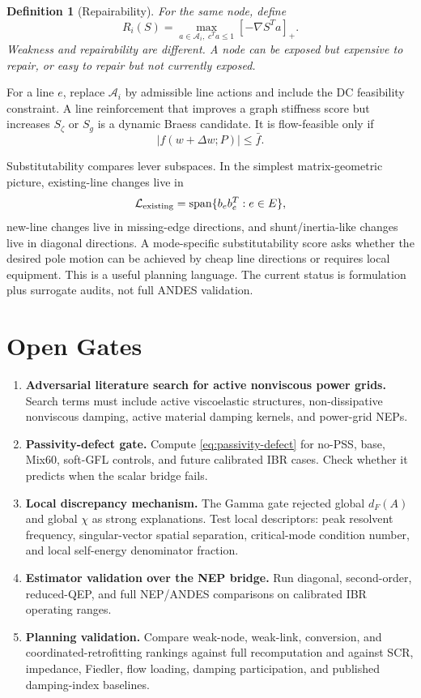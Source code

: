 \documentclass[11pt]{article}
\newtheorem{definition}{Definition}
\begin{document}
\begin{definition}[Repairability]
For the same node, define
\begin{equation}
  R_i(S)=\max_{a\in\mathcal A_i,\;c^Ta\le1}
  \left[-\nabla S^T a\right]_+ .
  \label{eq:repairability}
\end{equation}
Weakness and repairability are different. A node can be exposed but expensive
to repair, or easy to repair but not currently exposed.
\end{definition}

For a line $e$, replace $\mathcal A_i$ by admissible line actions and include
the DC feasibility constraint. A line reinforcement that improves a graph
stiffness score but increases $S_\zeta$ or $S_g$ is a dynamic Braess candidate.
It is flow-feasible only if
\begin{equation}
  |f(w+\Delta w;P)|\le \bar f.
  \label{eq:flow-feasible}
\end{equation}

Substitutability compares lever subspaces. In the simplest matrix-geometric
picture, existing-line changes live in
\[
  \mathcal L_{\rm existing}=\operatorname{span}\{b_eb_e^T:e\in E\},
\]
new-line changes live in missing-edge directions, and shunt/inertia-like
changes live in diagonal directions. A mode-specific substitutability score
asks whether the desired pole motion can be achieved by cheap line directions
or requires local equipment. This is a useful planning language. The current
status is formulation plus surrogate audits, not full ANDES validation.

\section{Open Gates}

\begin{enumerate}[leftmargin=*]
\item \textbf{Adversarial literature search for active nonviscous power grids.}
Search terms must include active viscoelastic structures, non-dissipative
nonviscous damping, active material damping kernels, and power-grid NEPs.
\item \textbf{Passivity-defect gate.} Compute \eqref{eq:passivity-defect} for
no-PSS, base, Mix60, soft-GFL controls, and future calibrated IBR cases.
Check whether it predicts when the scalar bridge fails.
\item \textbf{Local discrepancy mechanism.} The Gamma gate rejected global
$d_F(A)$ and global $\chi$ as strong explanations. Test local descriptors:
peak resolvent frequency, singular-vector spatial separation, critical-mode
condition number, and local self-energy denominator fraction.
\item \textbf{Estimator validation over the NEP bridge.} Run diagonal,
second-order, reduced-QEP, and full NEP/ANDES comparisons on calibrated IBR
operating ranges.
\item \textbf{Planning validation.} Compare weak-node, weak-link, conversion,
and coordinated-retrofitting rankings against full recomputation and against
SCR, impedance, Fiedler, flow loading, damping participation, and published
damping-index baselines.
\end{enumerate}
\end{document}
